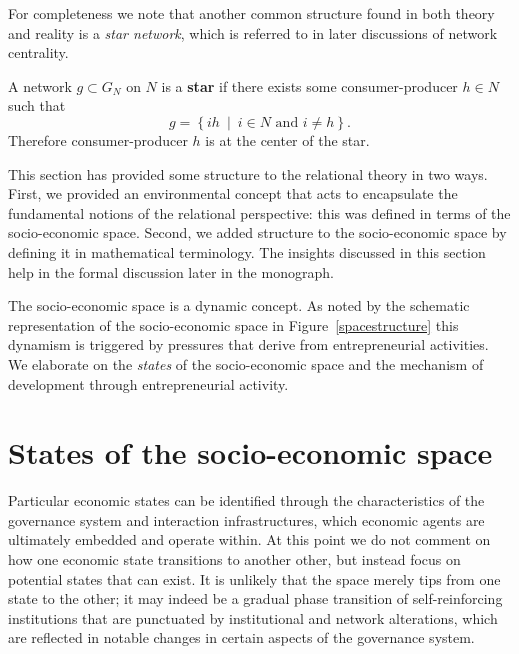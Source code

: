 For completeness we note that another common structure found in both theory and reality is a \emph{star network}, which is referred to in later discussions of network centrality.
\begin{definition} \label{def:starNetwork}
A network $g \subset G_{N}$ on $N$ is a \textbf{star} if there exists some consumer-producer $h \in N$ such that
\begin{equation}
g = \left\{ ih ~ \mid ~ i \in N \mbox{ and } i \neq h \right\}.
\end{equation}
Therefore consumer-producer $h$ is at the center of the star.
\end{definition}
This section has provided some structure to the relational theory in two ways. First, we provided an environmental concept that acts to encapsulate the fundamental notions of the relational perspective: this was defined in terms of the socio-economic space. Second, we added structure to the socio-economic space by defining it in mathematical terminology. The insights discussed in this section help in the formal discussion later in the monograph.

The socio-economic space is a dynamic concept. As noted by the schematic representation of the socio-economic space in Figure~\ref{spacestructure} this dynamism is triggered by pressures that derive from entrepreneurial activities. We elaborate on the \emph{states} of the socio-economic space and the mechanism of development through entrepreneurial activity.

\section{States of the socio-economic space}
\label{sec:StatesOfTheSocioEconomicSpace}


Particular economic states can be identified through the characteristics of the governance system and interaction infrastructures, which economic agents are ultimately embedded and operate within. At this point we do not comment on how one economic state transitions to another other, but instead focus on potential states that can exist. It is unlikely that the space merely tips from one state to the other; it may indeed be a gradual phase transition of self-reinforcing institutions that are punctuated by institutional and network alterations, which are reflected in notable changes in certain aspects of the governance system.

